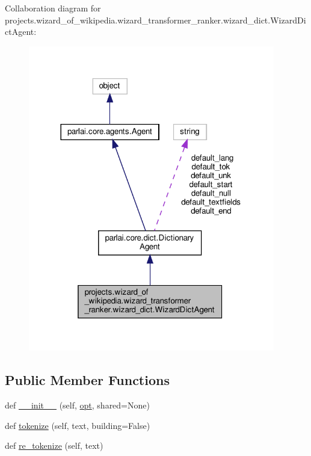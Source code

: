 Collaboration diagram for projects.\+wizard\+\_\+of\+\_\+wikipedia.\+wizard\+\_\+transformer\+\_\+ranker.\+wizard\+\_\+dict.\+Wizard\+Dict\+Agent\+:
\nopagebreak
\begin{figure}[H]
\begin{center}
\leavevmode
\includegraphics[width=305pt]{da/d4e/classprojects_1_1wizard__of__wikipedia_1_1wizard__transformer__ranker_1_1wizard__dict_1_1WizardDictAgent__coll__graph}
\end{center}
\end{figure}
\subsection*{Public Member Functions}
\begin{DoxyCompactItemize}
\item 
def \hyperlink{classprojects_1_1wizard__of__wikipedia_1_1wizard__transformer__ranker_1_1wizard__dict_1_1WizardDictAgent_abe32022c2dd77bd34b1185c81f512940}{\+\_\+\+\_\+init\+\_\+\+\_\+} (self, \hyperlink{classprojects_1_1wizard__of__wikipedia_1_1wizard__transformer__ranker_1_1wizard__dict_1_1WizardDictAgent_a831fb6427bb524c6ffdb0ceb287f53ae}{opt}, shared=None)
\item 
def \hyperlink{classprojects_1_1wizard__of__wikipedia_1_1wizard__transformer__ranker_1_1wizard__dict_1_1WizardDictAgent_a314852ee65380b494e078d51d73c0767}{tokenize} (self, text, building=False)
\item 
def \hyperlink{classprojects_1_1wizard__of__wikipedia_1_1wizard__transformer__ranker_1_1wizard__dict_1_1WizardDictAgent_ae65c7bad18faeb4fa72fb2448e123a33}{re\+\_\+tokenize} (self, text)
\end{DoxyCompactItemize}
